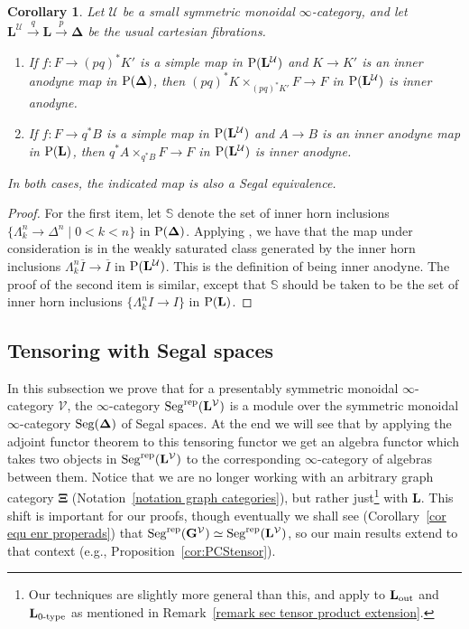\documentclass{amsart}
\numberwithin{theorem}{subsection}
\newtheorem{corollary}[theorem]{Corollary}
\theoremstyle{definition}
\newcommand{\xU}{\mathcal{U}}
\newcommand{\xV}{\mathcal{V}}
\newcommand{\olI}{\overline{I}}
\newcommand{\Pre}{\name{P}}
\newcommand{\icat}{$\infty$-category}
\newcommand{\name}[1]{\ensuremath{\text{\textup{#1}}}}
\newcommand{\simp}{\mathbf{\Delta}}
\newcommand{\levelg}{\mathbf{L}}
\newcommand{\levelV}{\levelg^\xV}
\newcommand{\levelU}{\levelg^\xU}
\newcommand{\bbY}{\mathbf{G}}
\newcommand{\bbYV}{\bbY^{\xV}}
\newcommand{\gc}{\mathbf{\Xi}}
\newcommand{\Seg}{\name{Seg}}
\newcommand{\Segrep}{\Seg^{\name{rep}}}
\begin{document}
\begin{corollary}\label{cor pb of inner anodyne}
Let $\xU$ be a small symmetric monoidal \icat{}, and let $\levelU \xrightarrow{q} \levelg \xrightarrow{p} \simp$ be the usual cartesian fibrations.
\begin{enumerate}
\item If $f\colon F\to (pq)^*K'$ is a simple map in $\Pre(\levelU)$ and $K\to K'$ is an inner anodyne map in $\Pre(\simp)$, then $(pq)^*K \times_{(pq)^*K'}F \to F$ in $\Pre(\levelU)$ is inner anodyne.
\item If $f\colon F \to q^*B$ is a simple map in $\Pre(\levelU)$ and $A\to B$ is an inner anodyne map in $\Pre(\levelg)$, then $q^*A \times_{q^*B} F \to F$ in $\Pre(\levelU)$ is inner anodyne.
\end{enumerate}
In both cases, the indicated map is also a Segal equivalence.
\end{corollary}
\begin{proof}
For the first item, let $\mathbb{S}$ denote the set of inner horn inclusions $\{\Lambda^n_k\to \Delta^n \mid 0<k<n \}$ in $\Pre(\simp)$. 
Applying \cite[Lemma 2.7.14]{ChuHaugseng}, we have that the map under consideration is in the weakly saturated class generated by the inner horn inclusions $\Lambda^n_k\olI\to \olI$ in $\Pre(\levelU)$.
This is the definition of being inner anodyne.
The proof of the second item is similar, except that $\mathbb{S}$ should be taken to be the set of inner horn inclusions $\{ \Lambda^n_k I \to I\}$ in $\Pre(\levelg)$.
\end{proof}

\subsection{Tensoring with Segal spaces}\label{sec tensor product}
In this subsection we prove that for a presentably symmetric monoidal \icat{} $\xV$, the \icat{} $\Segrep(\levelV)$ is a module over the symmetric monoidal \icat{} $\Seg(\simp)$ of Segal spaces.
At the end we will see that by applying the adjoint functor theorem to this tensoring functor we get an algebra functor which takes two objects in $\Segrep(\levelV)$ to the corresponding $\infty$-category of algebras between them.
Notice that we are no longer working with an arbitrary graph category $\gc$ (Notation~\ref{notation graph categories}), but rather just\footnote{Our techniques are slightly more general than this, and apply to $\levelg_{\name{out}}$ and $\levelg_{\name{0-type}}$ as mentioned in Remark~\ref{remark sec tensor product extension}.} with $\levelg$.
This shift is important for our proofs, though eventually we shall see (Corollary~\ref{cor equ enr properads}) that $\Segrep(\bbYV) \simeq \Segrep(\levelV)$, so our main results extend to that context (e.g., Proposition~\ref{cor:PCStensor}).
\end{document}
